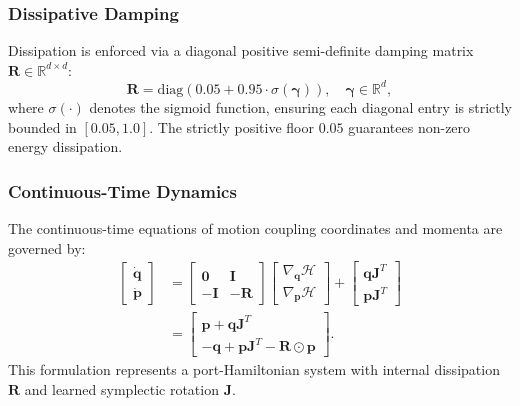 \documentclass[conference]{IEEEtran}
\begin{document}
\subsubsection{Dissipative Damping}
Dissipation is enforced via a diagonal positive semi-definite damping matrix $\mathbf{R} \in \mathbb{R}^{d \times d}$:
\begin{equation}
\label{eq:damping_matrix}
\mathbf{R} = \mathrm{diag}\left( 0.05 + 0.95 \cdot \sigma(\boldsymbol{\gamma}) \right), \quad \boldsymbol{\gamma} \in \mathbb{R}^d,
\end{equation}
where $\sigma(\cdot)$ denotes the sigmoid function, ensuring each diagonal entry is strictly bounded in $[0.05, 1.0]$. The strictly positive floor $0.05$ guarantees non-zero energy dissipation.

\subsubsection{Continuous-Time Dynamics}
The continuous-time equations of motion coupling coordinates and momenta are governed by:
\begin{equation}
\label{eq:hedo_ode}
\begin{aligned}
\begin{bmatrix} \dot{\mathbf{q}} \\ \dot{\mathbf{p}} \end{bmatrix} 
&= \begin{bmatrix} \mathbf{0} & \mathbf{I} \\ -\mathbf{I} & -\mathbf{R} \end{bmatrix} 
\begin{bmatrix} \nabla_{\mathbf{q}}\mathcal{H} \\ \nabla_{\mathbf{p}}\mathcal{H} \end{bmatrix} 
+ \begin{bmatrix} \mathbf{q} \mathbf{J}^T \\ \mathbf{p} \mathbf{J}^T \end{bmatrix} \\
&= \begin{bmatrix} \mathbf{p} + \mathbf{q} \mathbf{J}^T \\ -\mathbf{q} + \mathbf{p} \mathbf{J}^T - \mathbf{R} \odot \mathbf{p} \end{bmatrix}.
\end{aligned}
\end{equation}
This formulation represents a port-Hamiltonian system with internal dissipation $\mathbf{R}$ and learned symplectic rotation $\mathbf{J}$.
\end{document}
